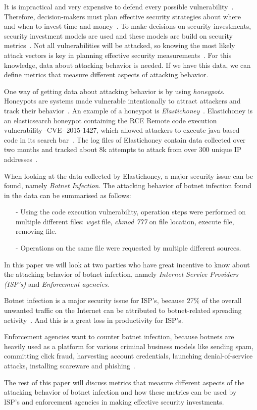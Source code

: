 \label{cap:sec1}

It is impractical and very expensive to defend every possible vulnerability~\cite{TARA}. Therefore, decision-makers must plan effective security strategies about where and when to invest time and money~\cite{ROSI}. To make decisions on security investments, security investment models are used and these models are build on security metrics~\cite{BR2010}. Not all vulnerabilities will be attacked, so knowing the most likely attack vectors is key in planning effective security measurements~\cite{TARA}. For this knowledge, data about attacking behavior is needed. If we have this data, we can define metrics that measure different aspects of attacking behavior.

One way of getting data about attacking behavior is by using \textit{honeypots}. Honeypots are systems made vulnerable intentionally to attract attackers and track their behavior~\cite{WP2010}. An example of a honeypot is \textit{Elastichoney}~\cite{BR2010}. Elastichoney is an elasticsearch honeypot containing the RCE Remote code execution vulnerability -CVE- 2015-1427, which allowed attackers to execute java based code in its search bar~\cite{CVE}. The log files of Elastichoney contain data collected over two months and tracked about 8k attempts to attack from over 300 unique IP addresses~\cite{BR2010}.

When looking at the data collected by Elastichoney, a major security issue can be found, namely \textit{Botnet Infection}. The attacking behavior of botnet infection found in the data can be summarised as follows:
\begin{itemize}
\item[-] Using the code execution vulnerability, operation steps were performed on multiple different files: \textit{wget} file, \textit{chmod 777} on file location, execute file, removing file.   
\item[-] Operations on the same file were requested by multiple different sources.
\end{itemize}
In this paper we will look at two parties who have great incentive to know about the attacking behavior of botnet infection, namely \textit{Internet Service Providers (ISP's)} and \textit{Enforcement agencies}.

Botnet infection is a major security issue for ISP's, because 27\% of the overall unwanted traffic on the Internet can be attributed to botnet-related spreading activity~\cite{AM2006}. And this is a great loss in productivity for ISP's.  

Enforcement agencies want to counter botnet infection, because botnets are heavily used as a platform for various criminal business models like sending spam, committing click fraud, harvesting account credentials, launching denial-of-service attacks, installing scareware and phishing~\cite{AR2013}.

The rest of this paper will discuss metrics that measure different aspects of the attacking behavior of botnet infection and how these metrics can be used by ISP's and enforcement agencies in making effective security investments.


